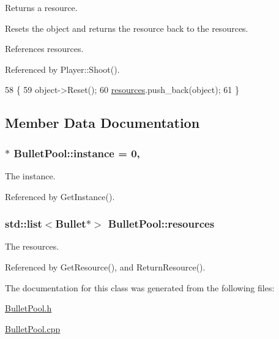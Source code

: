 Returns a resource. 

Resets the object and returns the resource back to the resources. 



 

 

References resources.



Referenced by Player\-::\-Shoot().


\begin{DoxyCode}
58 \{
59     \textcolor{keywordtype}{object}->Reset();
60     \hyperlink{class_bullet_pool_a1edef8514952653237ee829a197fd040}{resources}.push\_back(\textcolor{keywordtype}{object});
61 \}\end{DoxyCode}


\subsection{Member Data Documentation}
\hypertarget{class_bullet_pool_aac55f9e917420391431f394836222baf}{
\subsubsection[{instance}]{ $\ast$ Bullet\-Pool\-::instance = 0\hspace{0.3cm}{\ttfamily [static]}, {\ttfamily [private]}}}\label{class_bullet_pool_aac55f9e917420391431f394836222baf}


The instance. 



Referenced by Get\-Instance().

\hypertarget{class_bullet_pool_a1edef8514952653237ee829a197fd040}{
\subsubsection[{resources}]{\setlength{\rightskip}{0pt plus 5cm}std\-::list$<${\bf Bullet}$\ast$$>$ Bullet\-Pool\-::resources\hspace{0.3cm}{\ttfamily [private]}}}\label{class_bullet_pool_a1edef8514952653237ee829a197fd040}


The resources. 



Referenced by Get\-Resource(), and Return\-Resource().



The documentation for this class was generated from the following files\-:\begin{DoxyCompactItemize}
\item 
\hyperlink{_bullet_pool_8h}{Bullet\-Pool.\-h}\item 
\hyperlink{_bullet_pool_8cpp}{Bullet\-Pool.\-cpp}\end{DoxyCompactItemize}
